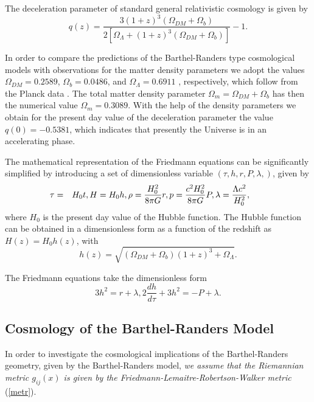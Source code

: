 \documentclass[aps,superscriptaddress, showpacs,preprintnumbers, superscriptaddress, nofootinbibt,twocolumn]{revtex4-2}
\def\be{\begin{equation}}
\def\ee{\end{equation}}
\begin{document}
The deceleration parameter of standard general relativistic cosmology is
given by
\begin{equation}
q(z)=\frac{3 (1+z)^3 \left(\Omega _{DM}+\Omega _b\right)}{2 \left[\Omega
_{\Lambda}+(1+z)^3 \left(\Omega _{DM}+\Omega _b\right)\right]}-1.
\end{equation}

In order to compare the predictions of the Barthel-Randers type cosmological models with observations  for the matter density parameters we adopt the values $\Omega
_{DM}=0.2589$, $\Omega _{b}=0.0486$, and $\Omega _{\Lambda}=0.6911$%
, respectively, which follow from the Planck data  \cite{1h}. The total matter
density parameter $\Omega _m=\Omega _{DM}+ \Omega _b$ has then the numerical
value $\Omega _m=0.3089$. With the help of the density parameters we obtain
for the present day value of the deceleration parameter the value $q(0)=-0.5381$,
which indicates that presently the Universe is in an accelerating phase.

The mathematical representation of the Friedmann equations can be
significantly simplified by introducing a set of dimensionless variable $%
\left(\tau, h,r,P,\lambda,\right)$, given by
\begin{eqnarray}
\hspace{-0.7cm}\tau &=& H_0t, H=H_0h, \rho =\frac{H_0^2}{8\pi G}r,p=\frac{c^2H_0^2}{8\pi G}P, \lambda =\frac{\Lambda c^2}{H_0^2},
\end{eqnarray}
where $H_0$ is the present day value of the Hubble function. The Hubble function can be obtained in a dimensionless form as a
function of the redshift as $H(z)=H_0h(z)$, with
\begin{equation}  \label{63}
h(z)=\sqrt{\left(\Omega _{DM}+\Omega _b\right)\left(1+z\right)^{3}+\Omega
_{\Lambda}}.
\end{equation}

The Friedmann equations take the dimensionless form
\be
3h^2=r+\lambda, 2\frac{dh}{d\tau}+3h^2=-P+\lambda.
\ee

\subsection{Cosmology of the Barthel-Randers Model}

In order to investigate the cosmological implications of the Barthel-Randers
geometry, given by the Barthel-Randers model, {\it we assume that the Riemannian metric $g_{ij}(x)$
is given by the Friedmann-Lemaitre-Robertson-Walker metric} (\ref{metr}).
\end{document}
